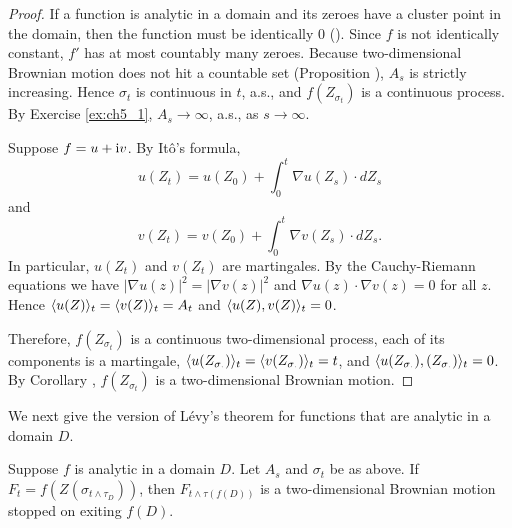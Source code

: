 \begin{proof}
If a function is analytic in a domain and its zeroes have a cluster point in the domain, then the function must be identically $0$ (\cite[][p.~127]{Ahlfors1979}). Since $f$ is not identically constant, $f'$ has at most countably many zeroes. Because two-dimensional Brownian motion does not hit a countable set (Proposition ), $A_s$ is strictly increasing. Hence $\sigma_t$ is continuous in $t$, a.s., and $f(Z_{\sigma_t})$ is a continuous process. By Exercise \ref{ex:ch5_1}, $A_s \to \infty$, a.s., as $s \to \infty$.

Suppose $f = u + \mathrm{i} v$. By It\^o's formula,
\begin{equation}\label{eq:ch5_1.2}
    u(Z_t) = u(Z_0) + \int_0^t \nabla u(Z_s) \cdot dZ_s
\end{equation}
and
\begin{equation}\label{eq:ch5_1.3}
    v(Z_t) = v(Z_0) + \int_0^t \nabla v(Z_s) \cdot dZ_s.
\end{equation}
In particular, $u(Z_t)$ and $v(Z_t)$ are martingales. By the Cauchy-Riemann equations we have $|\nabla u(z)|^2 = |\nabla v(z)|^2$ and $\nabla u(z) \cdot \nabla v(z) = 0$ for all $z$. Hence $\langle u(Z) \rangle_t = \langle v(Z) \rangle_t = A_t$ and $\langle u(Z),v(Z) \rangle_t = 0$.


Therefore, $f(Z_{\sigma_t})$ is a continuous two-dimensional process, each of its components is a martingale, $\langle u(Z_{\sigma_{\cdot}}) \rangle_t = \langle v(Z_{\sigma_{\cdot}}) \rangle_t = t$, and $\langle u(Z_{\sigma_{\cdot}}), (Z_{\sigma_{\cdot}}) \rangle_t \allowbreak = 0$. By Corollary , $f(Z_{\sigma_t})$ is a two-dimensional Brownian motion.
\end{proof}

We next give the version of L\'evy's theorem for functions that are analytic in a domain $D$.

\begin{theorem}\label{thm:ch5_1.2}
Suppose $f$ is analytic in a domain $D$. Let $A_s$ and $\sigma_t$ be as above. If $F_t = f(Z(\sigma_{t \wedge \tau_D}))$, then $F_{t \wedge \tau(f(D))}$ is a two-dimensional Brownian motion stopped on exiting $f(D)$.
\end{theorem}

